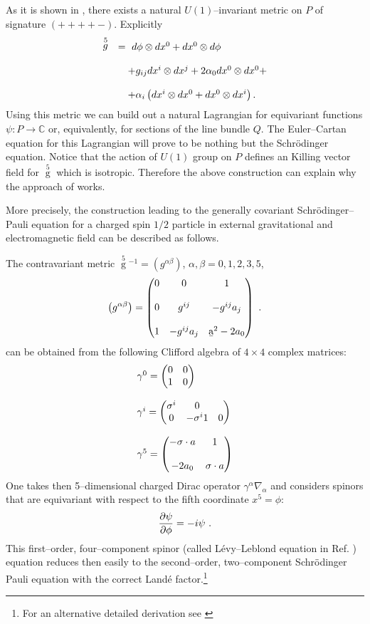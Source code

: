 \documentclass[12pt]{article}
\def\complex{{\mathbb C}}
\def\be{\begin{equation}} \def\ee{\end{equation}}
\begin{document}
As it is shown in \cite{jamo},  there exists a natural $U (1)$--invariant
metric on $P$ of signature $ (++++-)$.  Explicitly
$$
\begin{array}{ll}
\displaystyle\mathop{g}\limits^{5}
&  =\   d\phi \otimes dx^{0} + dx^{0} \otimes d\phi
\cr\cr
& \quad +g_{ij}dx^{i}\otimes dx^{j} + 2 \alpha_{0}
dx^{0}\otimes  dx^{0} + \cr\cr
& \quad + \alpha_{i}
\left ( dx^{i}\otimes dx^{0} + dx^{0}\otimes dx^{i} \right) . 
\end{array}
$$
Using this metric we can build out a natural Lagrangian for
equivariant functions $\psi :  P \rightarrow \complex$ or, 
equivalently,  for sections of the line bundle $Q$.  The Euler--Cartan
equation for this Lagrangian will prove to be  nothing but the
Schr\"{o}dinger equation.  Notice that the action of $U (1)$ group
on $P$ defines
an Killing vector field for $\mathop{g}\limits^{5}$ which is isotropic.
Therefore the above construction can explain why the
approach of \cite{duv} works.

More precisely,  the construction leading  to the generally
covariant Schr\"{o}\-din\-ger--Pauli equation for a charged spin $1/2$
particle in external gravitational and electromagnetic field can
be described as follows. 

The contravariant metric $\mathop{g}\limits^{5}{}^{-1}
=\left ( g^{\alpha \beta}\right)$, 
$\alpha,  \beta = 0, 1, 2, 3, 5$, 
\be
\left ( g^{\alpha \beta} \right)
= \begin{pmatrix} 0 & 0 & 1 \cr\cr
0 & g^{ij} & -g^{ij}a_{j} \cr\cr
1 & -g^{ij}a_{j} & \b{a}^{2}-2a_{0} 
\end{pmatrix}
\ . 
\ee
can be obtained from the following Clifford algebra of $4\times 4$
complex matrices: 
\be
\begin{array}{l}
\gamma^{0} = \begin{pmatrix}0 & 0 \cr
1 & 0
\end{pmatrix}
\cr\cr
\gamma^{i} = \begin{pmatrix} \sigma^{i} & 0 \cr
0 & - \sigma^{i} 
1 & 0
\end{pmatrix}
\cr\cr
\gamma^{5} = \begin{pmatrix}-{\sigma}\cdot {a} & 1 \cr\cr
 -2a_{0} & {\sigma} \cdot {a}
 \end{pmatrix}
\end{array}
\ee
One takes then 5--dimensional charged Dirac operator $\gamma^{\alpha}
\nabla_{\alpha}$ and considers spinors that are equivariant with
respect to the fifth coordinate $x^{5} = \phi: $
\be
{\partial \psi \over \partial \phi} = - i \psi \ . 
\ee
This first--order,  four--component spinor  (called L\'evy--Leblond
equation in Ref.  \cite{kun}) equation reduces then easily to the
second--order,  two--component Schr\"{o}\-din\-ger Pauli equation
with the correct Land\'e factor.\footnote{For an alternative
detailed derivation see \cite{can} }
\end{document}
